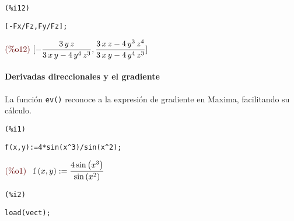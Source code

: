 \documentclass[12pt]{article}
\begin{document}
\noindent
\begin{minipage}[t]{8ex}{\color{red}\bf
\begin{verbatim}
(%i12) 
\end{verbatim}}
\end{minipage}
\begin{minipage}[t]{\textwidth}{\color{blue}
\begin{verbatim}
[-Fx/Fz,Fy/Fz];
\end{verbatim}}
\end{minipage}
\begin{math}\displaystyle
\parbox{8ex}{\color{labelcolor}(\%o12) }
[-\frac{3\,y\,z}{3\,x\,y-4\,{y}^{4}\,{z}^{3}},\frac{3\,x\,z-4\,{y}^{3}\,{z}^{4}}{3\,x\,y-4\,{y}^{4}\,{z}^{3}}]
\end{math}

\paragraph{Derivadas direccionales y el gradiente} La función \texttt{ev()} reconoce a la expresión de gradiente en Maxima, facilitando su cálculo.

\noindent
\begin{minipage}[t]{8ex}{\color{red}\bf
\begin{verbatim}
(%i1) 
\end{verbatim}}
\end{minipage}
\begin{minipage}[t]{\textwidth}{\color{blue}
\begin{verbatim}
f(x,y):=4*sin(x^3)/sin(x^2);
\end{verbatim}}
\end{minipage}
\begin{math}\displaystyle
\parbox{8ex}{\color{labelcolor}(\%o1) }
\mathrm{f}\left( x,y\right) :=\frac{4\,\mathrm{sin}\left( {x}^{3}\right) }{\mathrm{sin}\left( {x}^{2}\right) }
\end{math}


\noindent
\begin{minipage}[t]{8ex}{\color{red}\bf
\begin{verbatim}
(%i2) 
\end{verbatim}}
\end{minipage}
\begin{minipage}[t]{\textwidth}{\color{blue}
\begin{verbatim}
load(vect);
\end{verbatim}}
\end{minipage}
\end{document}
